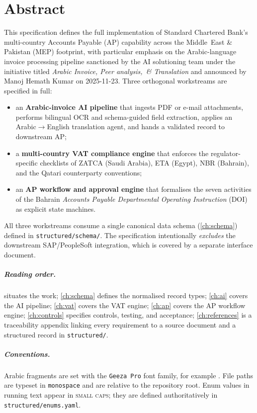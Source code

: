 \chapter*{Abstract}

This specification defines the full implementation of Standard Chartered
Bank's multi-country Accounts Payable (AP) capability across the
Middle~East \& Pakistan (MEP) footprint, with particular emphasis on the
Arabic-language invoice processing pipeline sanctioned by the AI solutioning
team under the initiative titled \emph{Arabic Invoice, Peer analysis,~\& Translation}
and announced by Manoj Hemath Kumar on 2025-11-23. Three orthogonal
workstreams are specified in full:

\begin{itemize}
  \item an \textbf{Arabic-invoice AI pipeline} that ingests PDF or e-mail
        attachments, performs bilingual OCR and schema-guided field
        extraction, applies an Arabic$\to$English translation agent,
        and hands a validated record to downstream AP;
  \item a \textbf{multi-country VAT compliance engine} that enforces the
        regulator-specific checklists of ZATCA (Saudi Arabia), ETA
        (Egypt), NBR (Bahrain), and the Qatari counterparty conventions;
  \item an \textbf{AP workflow and approval engine} that formalises the
        seven activities of the Bahrain \emph{Accounts Payable Departmental
        Operating Instruction} (DOI) as explicit state machines.
\end{itemize}

All three workstreams consume a single canonical data schema
(\cref{ch:schema}) defined in \corpus\texttt{structured/schema/}. The
specification intentionally \emph{excludes} the downstream SAP/PeopleSoft
integration, which is covered by a separate interface document.

\paragraph{Reading order.}  situates the work;
\cref{ch:schema} defines the normalised record types; \cref{ch:ai} covers
the AI pipeline; \cref{ch:vat} covers the VAT engine; \cref{ch:ap}
covers the AP workflow engine; \cref{ch:controls} specifies controls,
testing, and acceptance; \cref{ch:references} is a traceability
appendix linking every requirement to a source document and a structured
record in \corpus\texttt{structured/}.

\paragraph{Conventions.} Arabic fragments are set with the
\texttt{Geeza Pro} font family, for example .
File paths are typeset in \texttt{monospace} and are relative to the
repository root. Enum values in running text appear in \textsc{small
caps}; they are defined authoritatively in
\corpus\texttt{structured/enums.yaml}.
